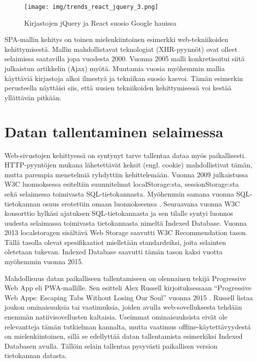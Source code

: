\documentclass[finnish,twoside,censored,csm,sw-track-2018]{HYthesisML}
\begin{document}
\begin{figure}[ht]
  \centering
    \texttt{[image: img/trends\_react\_jquery\_3.png]}
  \caption{Kirjastojen jQuery ja React suosio Google hauissa}
  \label{fig-react-vs-jquery}
\end{figure}

SPA-mallin kehitys on toinen mielenkiintoinen esimerkki web-tekniikoiden kehittymisestä. Mallin mahdollistavat teknologiat (XHR-pyynnöt) ovat olleet selaimissa saatavilla jopa vuodesta 2000. Vuonna 2005 malli konkretisoitui siitä julkaistun artikkelin (Ajax) myötä. Muutamia vuosia myöhemmin mallia käyttäviä kirjastoja alkoi ilmestyä ja tekniikan suosio kasvoi. Tämän esimerkin perusteella näyttäisi siis, että uusien tekniikoiden kehittymisessä voi kestää yllättävän pitkään.

\section{Datan tallentaminen selaimessa}

Web-sivustojen kehittyessä on syntynyt tarve tallentaa dataa myös paikallisesti. HTTP-pyyntöjen mukana lähetettävät keksit (engl. cookie) mahdollistivat tämän, mutta parempia menetelmiä ryhdyttiin kehittelemään. Vuonna 2009 julkaistussa W3C luonnoksessa \citep{W3C-2009-webstorage} esiteltiin suunnitelmat localStorage:sta, sessionStorage:sta sekä selaimessa toimivasta SQL-tietokannasta. Myöhemmin samana vuonna SQL-tietokannan osuus erotettiin omaan luonnokseensa \citep{W3C-2009-webdatabase}. Seuraavana vuonna W3C konsorttio hylkäsi \citep{W3C-2010-sqldatabase} ajatuksen SQL-tietokannasta ja sen tilalle syntyi luonnos \citep{W3C-2010-indexeddb} uudesta selaimassa toimivasta tietokannasta nimeltä Indexed Database. Vuonna 2013 localstoragen sisältävä Web Storage saavutti W3C Recommendation tason. Tällä tasolla olevat spesifikaatiot mielletään standardeiksi, joita selainten oletetaan tukevan. Indexed Database saavutti tämän tason kaksi vuotta myöhemmin vuonna 2015.

Mahdollisuus datan paikalliseen tallentamiseen on olennainen tekijä Progressive Web App eli PWA-mallille. Sen esitteli Alex Russell kirjoituksessaan ``Progressive Web Apps: Escaping Tabs Without Losing Our Soul'' vuonna 2015 \citep{pwa-coined}. Russell listaa joukon ominaisuuksia tai vaatimuksia, joiden avulla web-sovelluksesta tehdään enemmän natiivisovellusten kaltaisia. Useimmat ominaisuuksista eivät ole relevantteja tämän tutkielman kannalta, mutta vaatimus offline-käytettävyydestä on mielenkiintoinen, sillä se edellyttää datan tallentamista esimerkiksi Indexed Databasen avulla. Tällöin selain tallentaa pysyvästi paikallisen version tietokannan datasta. 
\end{document}
